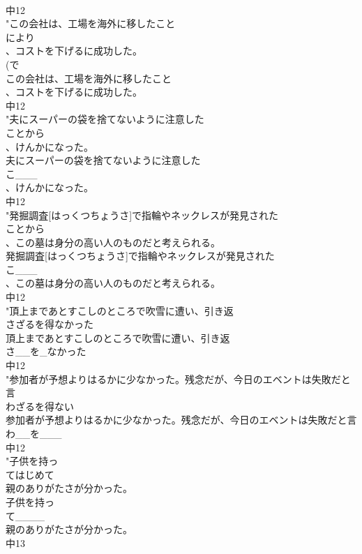 \documentclass[8pt]{extreport}
\begin{document}
\begin{CJK}{UTF8}{min}
\\	中12
\\	"この会社は、工場を海外に移したこと
\\	により
\\	、コストを下げるに成功した。
\\	(で 
\\	この会社は、工場を海外に移したこと
\\	、コストを下げるに成功した。
\\	中12
\\	"夫にスーパーの袋を捨てないように注意した
\\	ことから
\\	、けんかになった。
\\	夫にスーパーの袋を捨てないように注意した
\\	こ___
\\	、けんかになった。
\\	中12
\\	"発掘調査[はっくつちょうさ]で指輪やネックレスが発見された
\\	ことから
\\	、この墓は身分の高い人のものだと考えられる。
\\	発掘調査[はっくつちょうさ]で指輪やネックレスが発見された
\\	こ___
\\	、この墓は身分の高い人のものだと考えられる。
\\	中12
\\	"頂上まであとすこしのところで吹雪に遭い、引き返
\\	さざるを得なかった
\\	頂上まであとすこしのところで吹雪に遭い、引き返
\\	さ__を_なかった
\\	中12
\\	"参加者が予想よりはるかに少なかった。残念だが、今日のエベントは失敗だと言
\\	わざるを得ない
\\	参加者が予想よりはるかに少なかった。残念だが、今日のエベントは失敗だと言
\\	わ__を___
\\	中12
\\	"子供を持っ
\\	てはじめて
\\	親のありがたさが分かった。
\\	子供を持っ
\\	て____
\\	親のありがたさが分かった。
\\	中13

\end{CJK}
\end{document}
